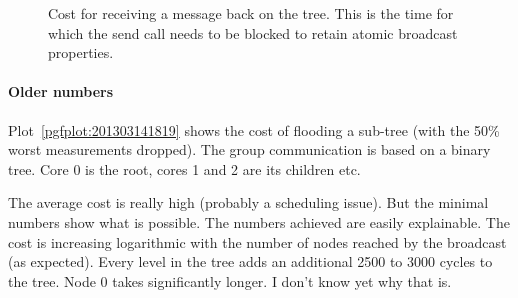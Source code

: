 \documentclass{article}
\begin{document}
\begin{figure}
  \caption{Cost for receiving a message back on the tree. This is the
    time for which the send call needs to be blocked to retain atomic
    broadcast properties.}
  \label{pgfplot:201305101058}
\end{figure}

\paragraph{Older numbers}

Plot~\ref{pgfplot:201303141819} shows the cost of flooding a sub-tree
(with the 50\% worst measurements dropped). The group communication is
based on a binary tree. Core 0 is the root, cores 1 and 2 are its
children etc.

The average cost is really high (probably a scheduling issue). But the
minimal numbers show what is possible. The numbers achieved are easily
explainable. The cost is increasing logarithmic with the number of
nodes reached by the broadcast (as expected). Every level in the tree
adds an additional 2500 to 3000 cycles to the tree. Node 0 takes
significantly longer. I don't know yet why that is.
\end{document}
